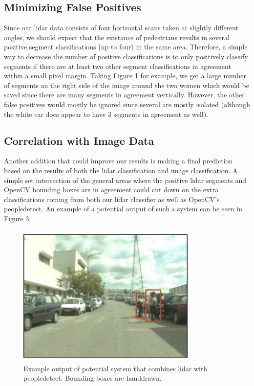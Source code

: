 \documentclass[10pt,twocolumn,letterpaper]{article}
\begin{document}
  \subsection{Minimizing False Positives}
  Since our lidar data consists of four horizontal scans taken at slightly different angles,
  we should expect that the existance of pedestrians results in several positive segment
  classifications (up to four) in the same area. Therefore, a simple way to decrease
  the number of positive classifications is to only positively classify segments if there
  are at least two other segment classifications in agreement within a small pixel margin.
  Taking Figure 1 for example, we get a large number of segments on the right side
  of the image around the two women which would be saved since there are many segments in
  agreement vertically. However, the other false positives would mostly be ignored
  since several are mostly isolated (although the white car does appear to have 3 segments
  in agreement as well).

  \subsection{Correlation with Image Data}
  Another addition that could improve our results is making a final prediction based
  on the results of both the lidar classification and image classification. A simple
  set intersection of the general areas where the positive lidar segments and OpenCV
  bounding boxes are in agreement could cut down on the extra classifications coming from
  both our lidar classifier as well as OpenCV's peopledetect. An example of a potential
  output of such a system can be seen in Figure 3.

  \begin{figure}
    \includegraphics[height=2.8in, width=3.5in]{images/futureWork.png}
    \caption{ Example output of potential system that combines lidar with peopledetect.
    Bounding boxes are handdrawn. }
  \end{figure}
\end{document}
